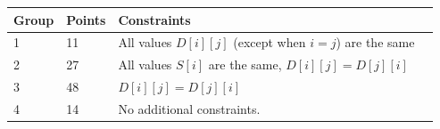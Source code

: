 \noindent
\begin{tabular}{| l | l | l | l |}
\hline
Group & Points & Constraints \\ \hline
1     & 11         & All values $D[i][j]$ (except when $i = j$) are the same \\ \hline
2     & 27         & All values $S[i]$ are the same, $D[i][j] = D[j][i]$\\ \hline
3     & 48         & $D[i][j] = D[j][i]$ \\ \hline
4     & 14         & No additional constraints. \\ \hline
\end{tabular}
